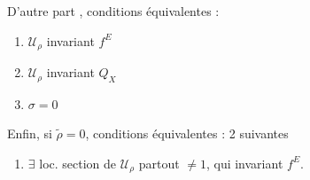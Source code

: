 \documentclass[11pt,a4paper]{article}
\begin{document}

D'autre part \struck{\ill{}}, conditions équivalentes \struck{\ill{}} :
\begin{enumerate}
\item[b)] $\mathcal{U}_\rho$ invariant $f^{E}$
\item[b)] $\mathcal{U}_\rho$ invariant $Q_X$
\item[a)] $\sigma = 0$
\end{enumerate}

Enfin, si $\tilde{\rho} = 0$,  \add{\ill{}} conditions équivalentes \ill{} : 2 suivantes
\begin{enumerate}
\item[d)] $\exists$ loc. section \struck{\ill{}} de $\mathcal{U}_\rho$ partout $\neq 1$, qui invariant $f^{E}$. 
\end{enumerate}
\struck{\ill{}}
\end{document}
